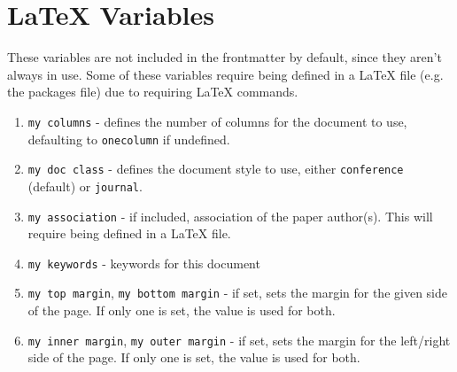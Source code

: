 \chapter{LaTeX Variables}
\label{latexvariables}

These variables are not included in the frontmatter by default, since they aren't always in use. Some of these variables require being defined in a LaTeX file (e.g. the packages file) due to requiring LaTeX commands.

\begin{enumerate}
\item \texttt{my columns} - defines the number of columns for the document to use, defaulting to \texttt{onecolumn} if undefined.

\item \texttt{my doc class} - defines the document style to use, either \texttt{conference} (default) or \texttt{journal}.

\item \texttt{my association} - if included, association of the paper author(s). This will require being defined in a LaTeX file.

\item \texttt{my keywords} - keywords for this document

\item \texttt{my top margin}, \texttt{my bottom margin} - if set, sets the margin for the given side of the page. If only one is set, the value is used for both.

\item \texttt{my inner margin}, \texttt{my outer margin} - if set, sets the margin for the left\slash right side of the page. If only one is set, the value is used for both.

\end{enumerate}